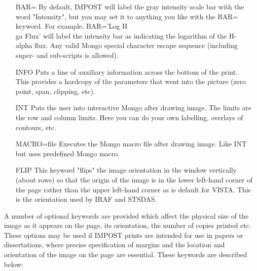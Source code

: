 \begin{itemize}
{          on the image. }
  \item[BAR=]{By default, IMPOST will label the gray intensity scale
          bar with the word "Intensity", but you may set it to 
          anything you like with the BAR= keyword.  For example,
          BAR='Log H\\ga Flux' will label the intensity bar as
          indicating the logarithm of the H-alpha flux.  Any valid
          Mongo special character escape sequence (including 
          super- and sub-scripts is allowed).}
  \item[INFO]{Puts a line of auxiliary information across the bottom of
          the print.  This provides a hardcopy of the parameters
          that went into the picture (zero point, span, clipping, etc).}
  \item[INT]{Puts the user into interactive Mongo after drawing image. The
          limits are the row and column limits. Here you can do your
          own labelling, overlays of contours, etc.}
  \item[MACRO=file]{Executes the Mongo macro file after drawing image. Like
          INT but uses predefined Mongo macro.}
  \item[FLIP]{This keyword "flips" the image orientation in the window
          vertically (about rows) so that the origin of the image is
          in the lower left-hand corner of the page rather than the
          upper left-hand corner as is default for VISTA.  This is
          the orientation used by IRAF and STSDAS.}
\end{itemize}


A number of optional keywords are provided which affect the physical size
of the image as it appears on the page, its orientation, the number of
copies printed etc.  These options may be used if IMPOST prints are
intended for use in papers or dissertations, where precise specification of
margins and the location and orientation of the image on the page are
essential.  These keywords are described below:

